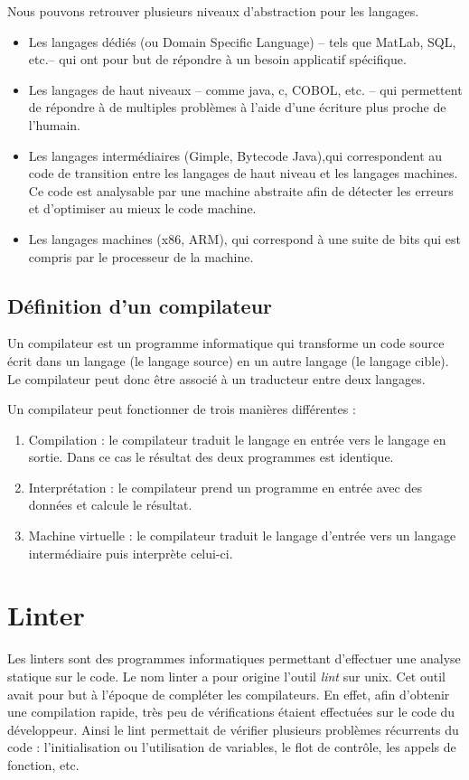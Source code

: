 \documentclass[12pt, twoside, openright]{report}
\begin{document}
Nous pouvons retrouver plusieurs niveaux d'abstraction pour les langages.\cite{compilateur01}
\begin{itemize}
    \item Les langages dédiés (ou Domain Specific Language) -- tels que MatLab, SQL, etc.-- qui ont pour but de répondre à un besoin applicatif spécifique. 
    \item Les langages de haut niveaux -- comme java, c, COBOL, etc. -- qui permettent de répondre à de multiples problèmes à l'aide d'une écriture plus proche de l'humain.
    \item Les langages intermédiaires (Gimple, Bytecode Java),qui correspondent au code de transition entre les langages de haut niveau et les langages machines. Ce code est analysable par une machine abstraite afin de détecter les erreurs et d'optimiser au mieux le code machine.
    \item Les langages machines (x86, ARM), qui correspond à une suite de bits qui est compris par le processeur de la machine.
\end{itemize}

\subsection{Définition d'un compilateur}

Un compilateur est un programme informatique qui transforme un code source écrit dans un langage (le langage source) en un autre langage (le langage cible). \cite{compilateur02} Le compilateur peut donc être associé à un traducteur entre deux langages. \cite{compilateur01}

Un compilateur peut fonctionner de trois manières différentes : 
\begin{enumerate}
    \item Compilation : le compilateur traduit le langage en entrée vers le langage en sortie. Dans ce cas le résultat des deux programmes est identique.
    \item Interprétation : le compilateur prend un programme en entrée avec des données et calcule le résultat.
    \item Machine virtuelle : le compilateur traduit le langage d'entrée vers un langage intermédiaire puis interprète celui-ci.
\end{enumerate}

\section{Linter}
Les linters sont des programmes informatiques permettant d'effectuer une analyse statique sur le code. Le nom linter a pour origine l'outil \textit{lint} sur unix. Cet outil avait pour but à l'époque de compléter les compilateurs. En effet, afin d'obtenir une compilation rapide, très peu de vérifications étaient effectuées sur le code du développeur. Ainsi le lint permettait de vérifier plusieurs problèmes récurrents du code : l'initialisation ou l'utilisation de variables, le flot de contrôle, les appels de fonction, etc. \cite{linter01}
\end{document}
